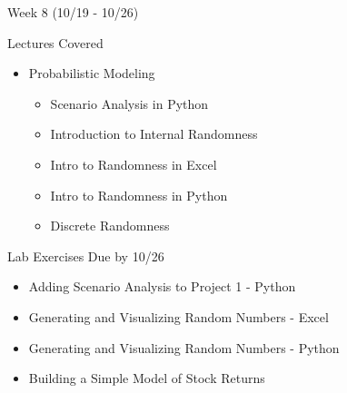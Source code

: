 \documentclass[]{article}
\begin{document}
\begin{section}{Week 8 (10/19 - 10/26)}
\begin{subsection}{Lectures Covered}
\begin{itemize}
\item Probabilistic Modeling
\begin{itemize}
\item Scenario Analysis in Python
\item Introduction to Internal Randomness
\item Intro to Randomness in Excel
\item Intro to Randomness in Python
\item Discrete Randomness
\end{itemize}
\end{itemize}
\end{subsection}
\begin{subsection}{Lab Exercises Due by 10/26}
\begin{itemize}
\item Adding Scenario Analysis to Project 1 - Python
\item Generating and Visualizing Random Numbers - Excel
\item Generating and Visualizing Random Numbers - Python
\item Building a Simple Model of Stock Returns
\end{itemize}
\end{subsection}
\end{section}
\end{document}
